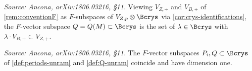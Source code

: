 \begin{definition}
  \label{def:Q-unram}
  \textit{Source: Ancona, arXiv:1806.03216, \S11.}
  Viewing \(V_{Z,+}\) and \(V_{B,+}\) of \cref{rem:conventionF} as \(F\)-subspaces
  of \(V_{Z,p} \otimes \Bcrys\) via \cref{cor:crys-identifications}, the
  \(F\)-vector subspace \(Q = Q(M) \subset \Bcrys\) is the set of
  \(\lambda \in \Bcrys\) with \(\lambda \cdot V_{B,+} \subset V_{Z,+}\).
\end{definition}

\begin{proposition}[\(P_i = Q\), unramified case]
  \label{prop:PQ-unram}
  \textit{Source: Ancona, arXiv:1806.03216, \S11.}
  The \(F\)-vector subspaces \(P_i, Q \subset \Bcrys\) of
  \cref{def:periods-unram} and \cref{def:Q-unram} coincide and have dimension
  one.
\end{proposition}

